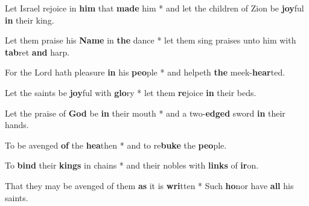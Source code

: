 \begin{multicols}{2}
	Let Israel rejoice in \textbf{him} that \textbf{made} him * and let the children of Zion be \textbf{joy}ful \textbf{in} their king.
	
	Let them praise his \textbf{Name} in \textbf{the} dance * let them sing praises unto him with \textbf{tab}ret \textbf{and} harp.
	
	For the Lord hath pleasure \textbf{in} his \textbf{peo}ple * and helpeth \textbf{the} meek-\textbf{hear}ted.
	
	Let the saints be \textbf{joy}ful with \textbf{glo}ry * let them \textbf{re}joice \textbf{in} their beds.
	
	Let the praise of \textbf{God} be \textbf{in} their mouth * and a two-\textbf{edged} sword \textbf{in} their hands.
	
	To be avenged \textbf{of} the \textbf{hea}then * and to re\textbf{buke} the \textbf{peo}ple.
	
	To \textbf{bind} their \textbf{kings} in chains * and their nobles with \textbf{links} of \textbf{ir}on.
	
	That they may be avenged of them \textbf{as} it is \textbf{wri}tten * Such \textbf{ho}nor have \textbf{all} his saints.
\end{multicols}
